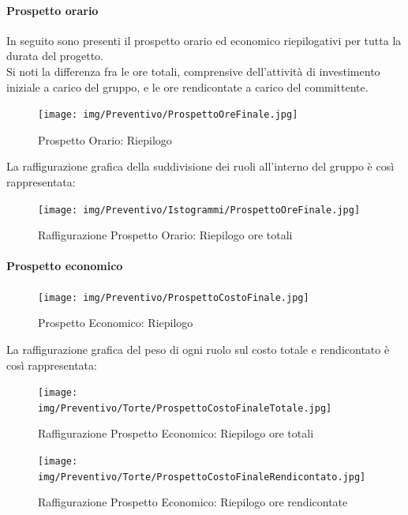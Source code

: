 \paragraph{Prospetto orario}
In seguito sono presenti il prospetto orario ed economico riepilogativi per tutta la durata del progetto.\\
Si noti la differenza fra le ore totali, comprensive dell'attività di investimento iniziale a carico del gruppo, e le ore rendicontate a carico del committente.
\begin{figure}[h!]
	\centerline{\texttt{[image: img/Preventivo/ProspettoOreFinale.jpg]}}
	\caption{Prospetto Orario: Riepilogo}
\end{figure}
La raffigurazione grafica della suddivisione dei ruoli all'interno del gruppo è così rappresentata: 
\begin{figure}[h!]
	\centerline{\texttt{[image: img/Preventivo/Istogrammi/ProspettoOreFinale.jpg]}}
	\caption{Raffigurazione Prospetto Orario: Riepilogo ore totali}
\end{figure}
\paragraph{Prospetto economico}
\begin{figure}[h!]
	\centerline{\texttt{[image: img/Preventivo/ProspettoCostoFinale.jpg]}}
	\caption{Prospetto Economico: Riepilogo}
\end{figure}
La raffigurazione grafica del peso di ogni ruolo sul costo totale e rendicontato è così rappresentata: 
\begin{figure}[h!]
	\centerline{\texttt{[image: img/Preventivo/Torte/ProspettoCostoFinaleTotale.jpg]}}
	\caption{Raffigurazione Prospetto Economico: Riepilogo ore totali}
\end{figure}
\begin{figure}[h!]
	\centerline{\texttt{[image: img/Preventivo/Torte/ProspettoCostoFinaleRendicontato.jpg]}}
	\caption{Raffigurazione Prospetto Economico: Riepilogo ore rendicontate}
\end{figure}